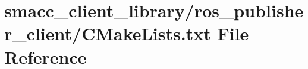 \hypertarget{smacc__client__library_2ros__publisher__client_2CMakeLists_8txt}{}\section{smacc\+\_\+client\+\_\+library/ros\+\_\+publisher\+\_\+client/\+C\+Make\+Lists.txt File Reference}
\label{smacc__client__library_2ros__publisher__client_2CMakeLists_8txt}
